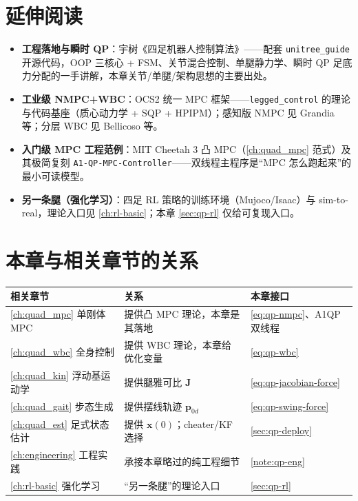 \section*{延伸阅读}
\begin{itemize}
  \item \textbf{工程落地与瞬时 QP}：宇树《四足机器人控制算法》\cite{unitree2023quadruped}——配套 \texttt{unitree\_guide} 开源代码，OOP 三核心 + FSM、关节混合控制、单腿静力学、瞬时 QP 足底力分配的一手讲解，本章关节/单腿/架构思想的主要出处。
  \item \textbf{工业级 NMPC+WBC}：OCS2 统一 MPC 框架\cite{sleiman2021unified}——\texttt{legged\_control} 的理论与代码基座（质心动力学 + SQP + HPIPM）；感知版 NMPC 见 Grandia 等\cite{grandia2022perceptive}；分层 WBC 见 Bellicoso 等\cite{bellicoso2016whole}。
  \item \textbf{入门级 MPC 工程范例}：MIT Cheetah 3 凸 MPC\cite{dicarlo2018cheetah}（\cref{ch:quad_mpc} 范式）及其极简复刻 \texttt{A1-QP-MPC-Controller}——双线程主程序是“MPC 怎么跑起来”的最小可读模型。
  \item \textbf{另一条腿（强化学习）}：四足 RL 策略的训练环境（Mujoco/Isaac）与 sim-to-real，理论入口见 \cref{ch:rl-basic}；本章 \cref{sec:qp-rl} 仅给可复现入口。
\end{itemize}

\section*{本章与相关章节的关系}
\begin{table}[H]\centering\small
\begin{tabular}{lll}
\toprule
相关章节 & 关系 & 本章接口 \\
\midrule
\cref{ch:quad_mpc} 单刚体 MPC & 提供凸 MPC 理论，本章是其落地 & \cref{eq:qp-nmpc}、A1QP 双线程 \\
\cref{ch:quad_wbc} 全身控制 & 提供 WBC 理论，本章给优化变量 & \cref{eq:qp-wbc} \\
\cref{ch:quad_kin} 浮动基运动学 & 提供腿雅可比 $\mathbf{J}$ & \cref{eq:qp-jacobian-force} \\
\cref{ch:quad_gait} 步态生成 & 提供摆线轨迹 $\boldsymbol{p}_{0d}$ & \cref{eq:qp-swing-force} \\
\cref{ch:quad_est} 足式状态估计 & 提供 $\boldsymbol{x}(0)$；cheater/KF 选择 & \cref{sec:qp-deploy} \\
\cref{ch:engineering} 工程实践 & 承接本章略过的纯工程细节 & \cref{note:qp-eng} \\
\cref{ch:rl-basic} 强化学习 & “另一条腿”的理论入口 & \cref{sec:qp-rl} \\
\bottomrule
\end{tabular}
\end{table}

